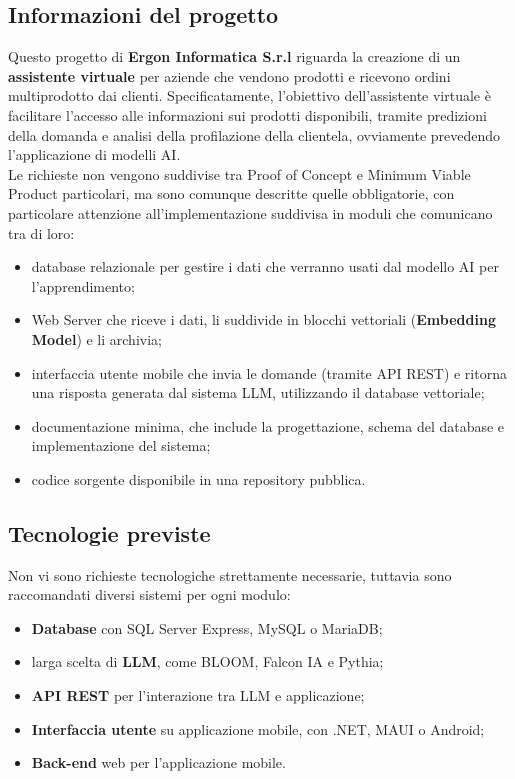 \documentclass[10pt]{article}
\begin{document}
    \subsection{Informazioni del progetto}
    Questo progetto di \textbf{Ergon Informatica S.r.l} riguarda la creazione di un \textbf{assistente virtuale}
    per aziende che vendono prodotti e ricevono ordini multiprodotto dai clienti.
    Specificatamente, l'obiettivo dell'assistente virtuale è facilitare l'accesso alle informazioni
    sui prodotti disponibili, tramite predizioni della domanda e analisi della profilazione
    della clientela, ovviamente prevedendo l'applicazione di modelli AI.\\
    Le richieste non vengono suddivise tra Proof of Concept e Minimum Viable Product particolari, ma sono comunque descritte
    quelle obbligatorie, con particolare attenzione all'implementazione suddivisa in moduli che comunicano tra di loro:
    \begin{itemize}
        \item database relazionale per gestire i dati che verranno usati dal modello AI per l'apprendimento;
        \item Web Server che riceve i dati, li suddivide in blocchi vettoriali (\textbf{Embedding Model}) e li archivia;
        \item interfaccia utente mobile che invia le domande (tramite API REST) e ritorna una risposta generata dal sistema LLM, utilizzando il database vettoriale;
        \item documentazione minima, che include la progettazione, schema del database e implementazione del sistema;
        \item codice sorgente disponibile in una repository pubblica.
    \end{itemize}
    
    \subsection{Tecnologie previste}
    Non vi sono richieste tecnologiche strettamente necessarie, tuttavia sono raccomandati diversi sistemi per ogni modulo:
    \begin{itemize}
        \item \textbf{Database} con SQL Server Express, MySQL o MariaDB;
        \item larga scelta di \textbf{LLM}, come BLOOM, Falcon IA e Pythia;
        \item \textbf{API REST} per l'interazione tra LLM e applicazione;
        \item \textbf{Interfaccia utente} su applicazione mobile, con .NET, MAUI o Android;
        \item \textbf{Back-end} web per l'applicazione mobile.
    \end{itemize}
    
\end{document}
